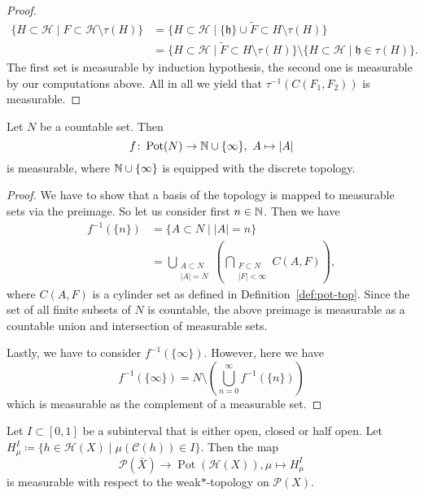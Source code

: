 \begin{proof}
  \begin{align*}
    \{H \subset \mathcal{H} \mid F \subset \mathcal{H} \setminus \tau(H)\}
    & = \{H \subset \mathcal{H} \mid \{\mathfrak{h}\} \cup \tilde F \subset H \setminus \tau(H)\}\\
    & = \{H \subset \mathcal{H} \mid \tilde{F} \subset H \setminus \tau(H)\} \setminus \{H \subset \mathcal{H} \mid \mathfrak{h} \in \tau(H)\}.
  \end{align*}
  The first set is measurable by induction hypothesis, the second one is measurable by our computations above. All in all we yield that \(\tau^{-1}(C(F_1, F_2))\) is measurable.
\end{proof}

\begin{lemma}
  \label{lem:measurable-countable}
  Let \(N\) be a countable set. Then
  \[
    f\colon \operatorname{Pot}(N) \to \mathbb{N} \cup \{\infty\},\ A \mapsto |A|
  \]
  is measurable, where \(\mathbb{N} \cup \{\infty\}\) is equipped with the discrete topology.
\end{lemma}
\begin{proof}
  We have to show that a basis of the topology is mapped to measurable sets via the preimage. So let us consider first \(n \in \mathbb{N}\). Then we have
  \begin{align*}
    f^{-1}(\{n\})
    & = \{ A \subset N \mid |A| = n\}\\
    & = \bigcup_{\substack{A \subset N\\|A| = N}} \left ( \bigcap_{\substack{F \subset N\\|F|< \infty}}C(A,F)\right),
  \end{align*}
  where \(C(A,F)\) is a cylinder set as defined in Definition~\ref{def:pot-top}. Since the set of all finite subsets of \(N\) is countable, the above preimage is measurable as a countable union and intersection of measurable sets.

  Lastly, we have to consider \(f^{-1}(\{\infty\})\). However, here we have
  \[
    f^{-1}(\{\infty\}) = N \setminus \left (\bigcup_{n=0}^\infty f^{-1}(\{n\})\right)
  \]
  which is measurable as the complement of a measurable set.
\end{proof}

\begin{lemma}[{\cites[Lem.\ A.1]{MR3509968}}]
  \label{lem:measurable-mu}
  Let \(I \subset [0,1]\) be a subinterval that is either open, closed or half open. Let \(H^I_\mu \coloneqq \{h \in \mathcal{H}(X) \mid \mu(\mathcal{C}(h)) \in I\}\). Then the map
  \[
    \mathcal{P}(\bar X) \to \operatorname{Pot}(\mathcal{H}(X)), \mu \mapsto H^I_\mu
  \]
  is measurable with respect to the weak\(\ast\)-topology on \(\mathcal{P}(X)\).
\end{lemma}

